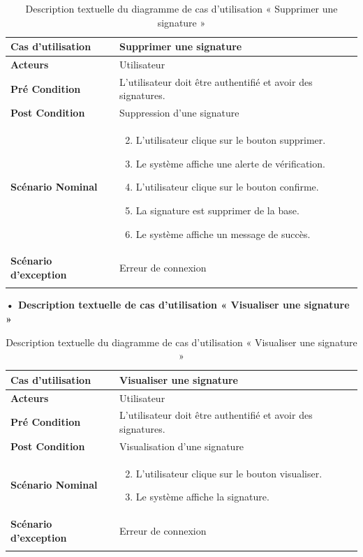 \begin{longtable}{|p{5cm}|p{10cm}|}
\hline
\textbf{Cas d'utilisation}&Supprimer une signature\\
\hline
\textbf{Acteurs}&Utilisateur \\
\hline
\textbf{Pré Condition}&L'utilisateur doit être authentifié et avoir des signatures.\\
\hline
\textbf{Post Condition}&Suppression  d'une signature\\
\hline
\textbf{Scénario Nominal}&
\vspace{-\baselineskip}
\begin{enumerate}
    \setcounter{enumi}{1}
    \item L'utilisateur clique sur le bouton supprimer.
    \item Le système affiche une alerte de vérification.
    \item L'utilisateur clique sur le bouton confirme.
    \item La signature est supprimer de la base.
    \item Le système affiche un message de succès.
\end{enumerate}\\
\hline
\textbf{Scénario d'exception}&Erreur de connexion\\
\hline
\caption{Description textuelle du diagramme de cas d'utilisation « Supprimer une signature »}
\label{tab:use_case_delete_signature}
\end{longtable}


\textbf{•	Description textuelle de cas d'utilisation « Visualiser une signature »}

\begin{longtable}{|p{5cm}|p{10cm}|}
\hline
\textbf{Cas d'utilisation}&Visualiser une signature\\
\hline
\textbf{Acteurs}&Utilisateur \\
\hline
\textbf{Pré Condition}&L'utilisateur doit être authentifié et avoir des signatures.\\
\hline
\textbf{Post Condition}&Visualisation d'une signature\\
\hline
\textbf{Scénario Nominal}&
\vspace{-\baselineskip}
\begin{enumerate}
    \setcounter{enumi}{1}
    \item L'utilisateur clique sur le bouton visualiser.
    \item Le système affiche la signature.
\end{enumerate}\\
\hline
\textbf{Scénario d'exception}&Erreur de connexion\\
\hline
\caption{Description textuelle du diagramme de cas d'utilisation « Visualiser une signature »}
\label{tab:use_case_view_single_signature}
\end{longtable}



